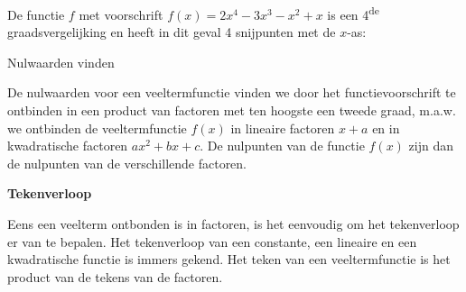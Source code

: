 \begin{voorbeeld}
	De functie $f$ met voorschrift $f(x)=2x^{4}-3x^{3}-x^{2}+x$
is een 4\textsuperscript{de} graadsvergelijking en heeft in dit geval
4 snijpunten met de $x$-as:



\end{voorbeeld}

Nulwaarden vinden

De nulwaarden voor een veeltermfunctie vinden we door het
functievoorschrift te ontbinden in een product van factoren met ten
hoogste een tweede graad, m.a.w. we ontbinden de veeltermfunctie $f(x)$
in lineaire factoren $x+a$ en in kwadratische factoren $ax^{2}+bx+c$.
De nulpunten van de functie $f(x)$ zijn dan de nulpunten van de verschillende
factoren.

\textbf{Tekenverloop}

Eens een veelterm ontbonden is in factoren, is het eenvoudig
om het tekenverloop er van te bepalen. Het tekenverloop van een constante,
een lineaire en een kwadratische functie is immers gekend. Het teken
van een veeltermfunctie is het product van de tekens van de factoren.



